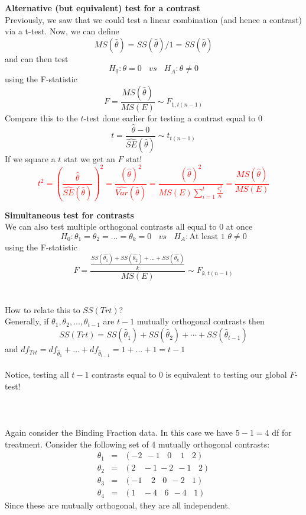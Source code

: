 \textbf{Alternative (but equivalent) test for a contrast}\\
Previously, we saw that we could test a linear combination (and hence a contrast) via a t-test.  Now, we can define 
$$MS(\hat{\theta})=SS(\hat{\theta})/1=SS(\hat{\theta})$$
and can then test
$$H_0:\theta=0~~~~vs~~~~H_A:\theta\neq 0$$
using the F-statistic
$$F=\frac{MS(\hat{\theta})}{MS(E)}\sim F_{1,t(n-1)}$$
Compare this to the $t$-test done earlier for testing a contrast equal to 0
$$t=\frac{\hat{\theta}-0}{\hat{SE}(\hat{\theta})}\sim t_{t(n-1)}$$
If we square a $t$ stat we get an $F$ stat!
\textcolor{red}{$$t^2=\left(\frac{\hat{\theta}}{\hat{SE}(\hat{\theta})}\right)^2=\frac{\left(\hat{\theta}\right)^2}{\hat{Var}(\hat{\theta})}=\frac{\left(\hat{\theta}\right)^2}{MS(E)\sum_{i=1}^{t}\frac{c_i^2}{n}}=\frac{MS(\hat{\theta})}{MS(E)}$$}

\newpage

\textbf{Simultaneous test for contrasts}\\
We can also test multiple orthogonal contrasts all equal to 0 at once
$$H_0:\theta_1=\theta_2=...=\theta_k=0~~~~vs~~~~H_A:\mbox{At least 1 }\theta\neq 0$$
using the F-statistic
$$F=\frac{\frac{SS(\hat{\theta_1})+SS(\hat{\theta_2})+...+SS(\hat{\theta_k})}{k}}{MS(E)}\sim F_{k,t(n-1)}$$
~\\~\\
How to relate this to $SS(Trt)$? \\
Generally, if $\theta_1,\theta_2,...,\theta_{t-1}$ are $t-1$ mutually orthogonal contrasts then
$$ SS(Trt)=SS(\hat\theta_1)+SS(\hat\theta_2)+\cdots+SS(\hat\theta_{t-1})$$
and $df_{Trt}=df_{\hat\theta_1}+...+df_{\hat\theta_{t-1}}=1+...+1=t-1$\\~\\
Notice, testing all $t-1$ contrasts equal to 0 is equivalent to testing our global $F$-test!\\~\\~\\~\\

Again consider the Binding Fraction data.  In this case we have $5-1=4$ df for treatment.  Consider the following set of 4 mutually orthogonal contrasts:
\begin{eqnarray*}
\theta_1&=&(-2~~-1~~~~0~~~~~1~~~~2)\\
\theta_2&=&(2~~~~-1~-2~~-1~~~~2)\\
\theta_3&=&(-1~~~~~2~~~~0~~-2~~~~1)\\
\theta_4&=&(1~~~~-4~~~~6~~-4~~~~1)
\end{eqnarray*}
Since these are mutually orthogonal, they are all independent.\\

